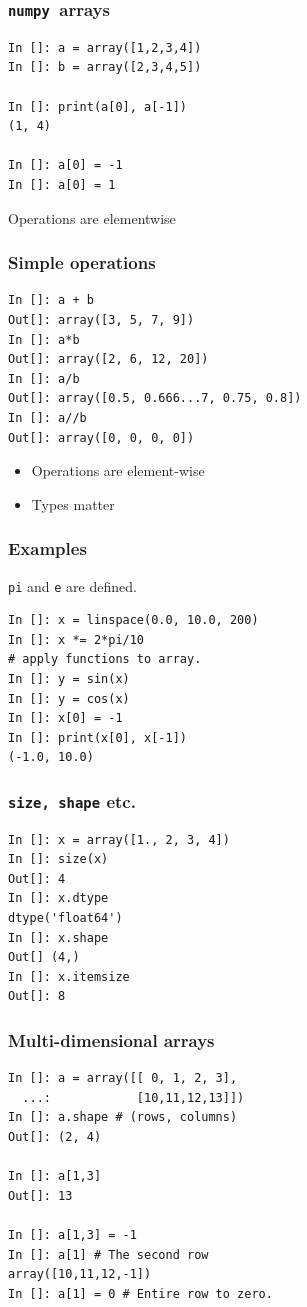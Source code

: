 \documentclass[14pt,compress]{beamer}
\newcounter{time}
\newcommand{\inctime}[1]{\addtocounter{time}{#1}{\tiny \thetime\ m}}
\newcommand{\typ}[1]{\lstinline{#1}}
\newcommand{\num}{\texttt{numpy}}
\begin{document}
\begin{frame}[fragile]
  \frametitle{\num\ arrays}
\begin{lstlisting}
In []: a = array([1,2,3,4])
In []: b = array([2,3,4,5])

In []: print(a[0], a[-1])
(1, 4)

In []: a[0] = -1
In []: a[0] = 1
\end{lstlisting}
Operations are elementwise
\end{frame}

\begin{frame}[fragile]
  \frametitle{Simple operations}
\begin{lstlisting}
In []: a + b
Out[]: array([3, 5, 7, 9])
In []: a*b
Out[]: array([2, 6, 12, 20])
In []: a/b
Out[]: array([0.5, 0.666...7, 0.75, 0.8])
In []: a//b
Out[]: array([0, 0, 0, 0])
\end{lstlisting}
  \begin{itemize}
  \item Operations are \alert{element-wise}
  \item Types matter
  \end{itemize}
  \inctime{10}
\end{frame}

\begin{frame}[fragile]
\end{frame}

\begin{frame}[fragile]
  \frametitle{Examples}
\noindent \typ{pi} and \typ{e} are defined.
\begin{lstlisting}
In []: x = linspace(0.0, 10.0, 200)
In []: x *= 2*pi/10
# apply functions to array.
In []: y = sin(x)
In []: y = cos(x)
In []: x[0] = -1
In []: print(x[0], x[-1])
(-1.0, 10.0)
\end{lstlisting}
\end{frame}

\begin{frame}[fragile]
    \frametitle{\typ{size, shape} etc.}
\vspace*{-8pt}
\begin{lstlisting}
In []: x = array([1., 2, 3, 4])
In []: size(x)
Out[]: 4
In []: x.dtype
dtype('float64')
In []: x.shape
Out[] (4,)
In []: x.itemsize
Out[]: 8
\end{lstlisting}
\end{frame}


\begin{frame}[fragile]
  \frametitle{Multi-dimensional arrays}
\begin{lstlisting}
In []: a = array([[ 0, 1, 2, 3],
  ...:            [10,11,12,13]])
In []: a.shape # (rows, columns)
Out[]: (2, 4)

In []: a[1,3]
Out[]: 13

In []: a[1,3] = -1
In []: a[1] # The second row
array([10,11,12,-1])
In []: a[1] = 0 # Entire row to zero.
\end{lstlisting}
\inctime{10}
\end{frame}
\end{document}
